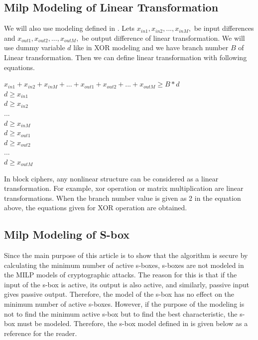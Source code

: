 \subsection{Milp Modeling of Linear Transformation }
We will also use modeling defined in \cite{mouha2012differential}. Lets $x_{in1}, x_{in2}, ... ,x_{inM}, $ be input differences and $x_{out1}, x_{out2}, ... ,x_{outM}, $ be output difference of linear transformation. We will use dummy variable $d$ like in XOR modeling and we have branch number $B$ of Linear transformation. Then we can define linear transformation with following equations. 

\begin{center}
    $x_{in1} + x_{in2} + x_{inM} + ... + x_{out1} + x_{out2} + ... + x_{outM}  \geq B*d $ \\
    $d \geq x_{in1} $ \\
    $d \geq x_{in2} $ \\
    $...$\\
    $d \geq x_{inM} $ \\
    $d \geq x_{out1} $\\
    $d \geq x_{out2} $ \\
    $...$\\
    $d \geq x_{outM} $
\end{center}

In block ciphers, any nonlinear structure can be considered as a linear transformation. For example, xor operation or matrix multiplication are linear transformations. When the branch number value is given as 2 in the equation above, the equations given for XOR operation are obtained.

\subsection{Milp Modeling of S-box}

Since the main purpose of this article is to show that the algorithm is secure by calculating the minimum number of active s-boxes, s-boxes are not modeled in the MILP models of cryptographic attacks. The reason for this is that if the input of the s-box is active, its output is also active, and similarly, passive input gives passive output. Therefore, the model of the s-box has no effect on the minimum number of active s-boxes. However, if the purpose of the modeling is not to find the minimum active s-box but to find the best characteristic, the s-box must be modeled. Therefore, the s-box model defined in \cite{sun2014automatic} is given below as a reference for the reader.

